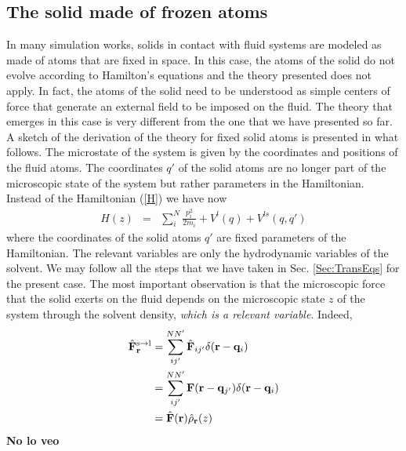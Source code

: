 \documentclass[b5paper,openright,11pt]{book}
\newcommand{\Note}[1]{{\bf \color{red}#1}}    %
\begin{document}
\subsection{The solid made of frozen atoms}
In many  simulation works,  solids in contact  with fluid  systems are
modeled as made of atoms that are  fixed in space.  In this case, the
atoms of the solid do not evolve according to Hamilton's equations and
the theory presented  does not apply. In fact, the  atoms of the solid
need to  be understood  as simple  centers of  force that  generate an
external field to be imposed on  the fluid. The theory that emerges in
this case  is very different  from the one  that we have  presented so
far.  A sketch  of the derivation of the theory  for fixed solid atoms
is presented in  what follows.  The microstate of the  system is given
by the coordinates  and positions of the fluid  atoms. The coordinates
$q'$ of the solid atoms are no longer part of the microscopic state of
the system but  rather parameters in the Hamiltonian.   Instead of the
Hamiltonian (\ref{H}) we have now
\begin{eqnarray}
H(z) &=& \sum^N_i \frac{p_i^2}{2m_i} + V^{l}(q)+ V^{ls}(q,q')
\label{Hfrozen}
\end{eqnarray}
where the coordinates of the solid  atoms $q'$ are fixed parameters of
the  Hamiltonian.  The  relevant variables  are only  the hydrodynamic
variables of  the solvent. We  may follow all  the steps that  we have
taken  in Sec.  \ref{Sec:TransEqs}  for the  present  case.  The  most
important  observation is  that the  microscopic force  that the  solid
exerts on the fluid depends on the microscopic state $z$ of the system
through the solvent density, \textit{which is a relevant variable}. Indeed,
\begin{align}
  \hat{\bf F}^{\rm s\to l}_{\bf r}&=\sum^{NN'}_{ij'}\hat{\bf F}_{ij'}\delta({\bf r}-{\bf q}_i)
\nonumber\\
&=\sum^{NN'}_{ij'}{\bf F}({\bf r}-{\bf q}_{j'})\delta({\bf r}-{\bf q}_i)
\nonumber\\
&=\hat{\bf F}({\bf r})\hat{\rho}_{\bf r}(z)
\end{align}
\Note{No lo veo}
\end{document}
